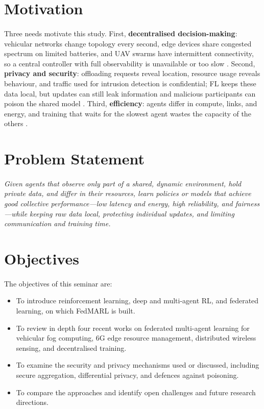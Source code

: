 \documentclass[12pt,a4paper,final]{extreport}
\begin{document}
\section{Motivation}

\paragraph{} Three needs motivate this study. First, \textbf{decentralised decision-making}: vehicular networks change topology every second, edge devices share congested spectrum on limited batteries, and UAV swarms have intermittent connectivity, so a central controller with full observability is unavailable or too slow \cite{p1,p2}. Second, \textbf{privacy and security}: offloading requests reveal location, resource usage reveals behaviour, and traffic used for intrusion detection is confidential; FL keeps these data local, but updates can still leak information and malicious participants can poison the shared model \cite{p2,p3}. Third, \textbf{efficiency}: agents differ in compute, links, and energy, and training that waits for the slowest agent wastes the capacity of the others \cite{p4}.

\section{Problem Statement}

\paragraph{} \emph{Given agents that observe only part of a shared, dynamic environment, hold private data, and differ in their resources, learn policies or models that achieve good collective performance---low latency and energy, high reliability, and fairness---while keeping raw data local, protecting individual updates, and limiting communication and training time.}

\section{Objectives}

\paragraph{} The objectives of this seminar are:
\begin{itemize}
  \item To introduce reinforcement learning, deep and multi-agent RL, and federated learning, on which FedMARL is built.
  \item To review in depth four recent works on federated multi-agent learning for vehicular fog computing, 6G edge resource management, distributed wireless sensing, and decentralised training.
  \item To examine the security and privacy mechanisms used or discussed, including secure aggregation, differential privacy, and defences against poisoning.
  \item To compare the approaches and identify open challenges and future research directions.
\end{itemize}
\end{document}
